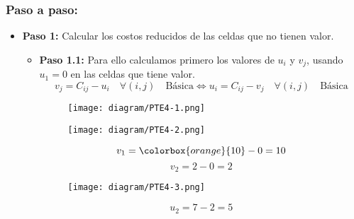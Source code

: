 \documentclass{templateNote}
\begin{document}
\subsubsection*{Paso a paso:}
\begin{itemize}
    \item \textbf{Paso 1:} Calcular los costos reducidos de las celdas que no tienen valor. 
    \begin{itemize}
        \item \textbf{Paso 1.1:} Para ello calculamos primero los valores de $u_i$ y $v_j$, usando $u_1 = 0$ en las celdas que tiene valor.
        \begin{equation*}
            v_j = C_{ij} - u_i \quad \forall (i,j) \quad \text{Básica} \Leftrightarrow u_i = C_{ij} - v_j \quad \forall (i,j) \quad \text{Básica}
        \end{equation*}
        \begin{figure}[H]
            \centering
            \texttt{[image: diagram/PTE4-1.png]}
        \end{figure}
        \begin{minipage}{0.6\textwidth}
            \begin{figure}[H]
                \centering
                \texttt{[image: diagram/PTE4-2.png]}
            \end{figure}
        \end{minipage}
        \begin{minipage}{0.3\textwidth}
            \begin{equation*}
                v_1 = \colorbox{orange}{10} - 0 = 10
            \end{equation*}
            \begin{equation*}
                v_2 = 2 - 0 = 2
            \end{equation*}
        \end{minipage}
        
        \begin{minipage}{0.6\textwidth}
            \begin{figure}[H]
                \centering
                \texttt{[image: diagram/PTE4-3.png]}
            \end{figure}
        \end{minipage}
        \begin{minipage}{0.3\textwidth}
            \begin{equation*}
                u_2 = 7 - 2 = 5
            \end{equation*}
        \end{minipage}


\end{itemize}
\end{itemize}
\end{document}
